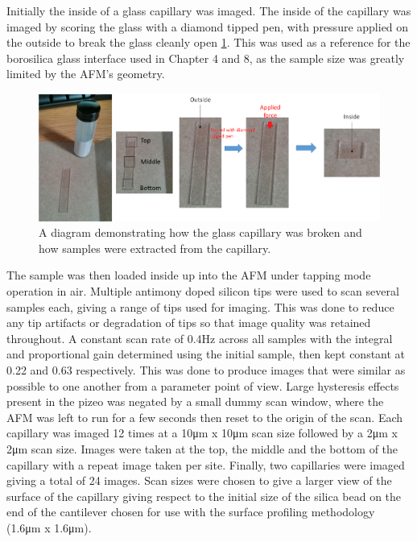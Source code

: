 Initially the inside of a glass capillary was imaged. The inside of the capillary was imaged by scoring the glass with a diamond tipped pen, with pressure applied on the outside to break the glass cleanly open \ref{fig:figure8}. This was used as a reference for the borosilica glass interface used in Chapter 4 and 8, as the sample size was greatly limited by the AFM's geometry.

\begin{figure}[h]     %
        \begin{center}
          \includegraphics[width=120mm]{chapter3/Figure8.png}
\end{center}
\caption{A diagram demonstrating how the glass capillary was broken and how samples were extracted from the capillary.}
\label{fig:figure8}                 %
\end{figure}   


The sample was then loaded inside up into the AFM under tapping mode operation in air. Multiple antimony doped silicon tips were used to scan several samples each, giving a range of tips used for imaging. This was done to reduce any tip artifacts or degradation of tips so that image quality was retained throughout. A constant scan rate of 0.4Hz across all samples with the integral and proportional gain determined using the initial sample, then kept constant at 0.22 and 0.63 respectively. This was done to produce images that were similar as possible to one another from a parameter point of view. Large hysteresis effects present in the pizeo was negated by a small dummy scan window, where the AFM was left to run for a few seconds then reset to the origin of the scan. Each capillary was imaged 12 times at a 10μm x 10μm scan size followed by a 2μm x 2μm scan size. Images were taken at the top, the middle and the bottom of the capillary with a repeat image taken per site. Finally, two capillaries were imaged giving a total of 24 images. Scan sizes were chosen to give a larger view of the surface of the capillary giving respect to the initial size of the silica bead on the end of the cantilever chosen for use with the surface profiling methodology (1.6μm x 1.6μm). 

